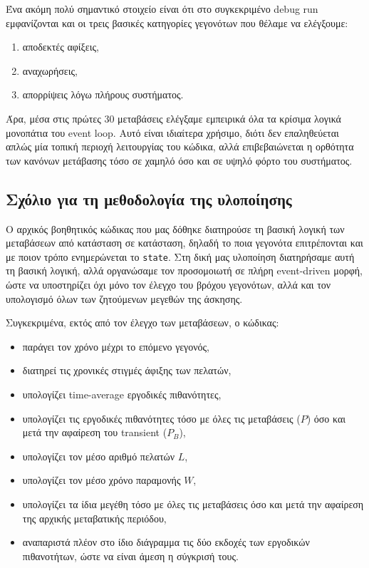 \documentclass{article}
\begin{document}
Ένα ακόμη πολύ σημαντικό στοιχείο είναι ότι στο συγκεκριμένο \foreignlanguage{english}{debug} run εμφανίζονται και οι τρεις βασικές κατηγορίες γεγονότων που θέλαμε να ελέγξουμε:

\begin{enumerate}[label=\roman*)]
    \item αποδεκτές αφίξεις,
    \item αναχωρήσεις,
    \item απορρίψεις λόγω πλήρους συστήματος.
\end{enumerate}

Άρα, μέσα στις πρώτες $30$ μεταβάσεις ελέγξαμε εμπειρικά όλα τα κρίσιμα λογικά μονοπάτια του \foreignlanguage{english}{event loop}. Αυτό είναι ιδιαίτερα χρήσιμο, διότι δεν επαληθεύεται απλώς μία τοπική περιοχή λειτουργίας του κώδικα, αλλά επιβεβαιώνεται η ορθότητα των κανόνων μετάβασης τόσο σε χαμηλό όσο και σε υψηλό φόρτο του συστήματος.

\subsection{Σχόλιο για τη μεθοδολογία της υλοποίησης}

Ο αρχικός βοηθητικός κώδικας που μας δόθηκε διατηρούσε τη βασική λογική των μεταβάσεων από κατάσταση σε κατάσταση, δηλαδή το ποια γεγονότα επιτρέπονται και με ποιον τρόπο ενημερώνεται το \texttt{state}. Στη δική μας υλοποίηση διατηρήσαμε αυτή τη βασική λογική, αλλά οργανώσαμε τον προσομοιωτή σε πλήρη \foreignlanguage{english}{event-driven} μορφή, ώστε να υποστηρίζει όχι μόνο τον έλεγχο του βρόχου γεγονότων, αλλά και τον υπολογισμό όλων των ζητούμενων μεγεθών της άσκησης.

Συγκεκριμένα, εκτός από τον έλεγχο των μεταβάσεων, ο κώδικας:

\begin{itemize}
    \item παράγει τον χρόνο μέχρι το επόμενο γεγονός,
    \item διατηρεί τις χρονικές στιγμές άφιξης των πελατών,
    \item υπολογίζει \foreignlanguage{english}{time-average} εργοδικές πιθανότητες,
    \item υπολογίζει τις εργοδικές πιθανότητες τόσο με όλες τις μεταβάσεις ($P$) όσο και μετά την αφαίρεση του transient ($P_B$),
    \item υπολογίζει τον μέσο αριθμό πελατών $L$,
    \item υπολογίζει τον μέσο χρόνο παραμονής $W$,
    \item υπολογίζει τα ίδια μεγέθη τόσο με όλες τις μεταβάσεις όσο και μετά την αφαίρεση της αρχικής μεταβατικής περιόδου,
    \item αναπαριστά πλέον στο ίδιο διάγραμμα τις δύο εκδοχές των εργοδικών πιθανοτήτων, ώστε να είναι άμεση η σύγκρισή τους.
\end{itemize}
\end{document}
